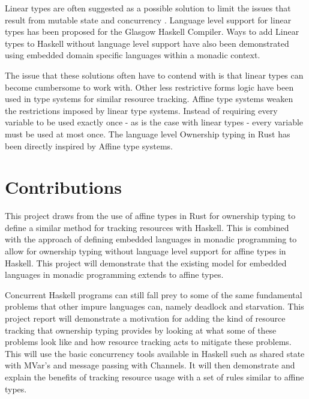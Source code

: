 \documentclass[onehalf,11pt]{beavtex}
\begin{document}
Linear types are often suggested as a possible solution to limit the issues that
result from mutable state \cite{Wadler90lineartypes} and concurrency
\cite{caires2010session}.  Language level support for linear types has been
proposed for the Glasgow Haskell Compiler. \cite{LinearTypesGHC}
Ways to add Linear types to Haskell without language level support have also
been demonstrated using embedded domain specific languages within a monadic
context. \cite{Paykin:2017:LM:3122955.3122965}

The issue that these solutions often have to contend with is that linear types
can become cumbersome to work with.
Other less restrictive forms logic have been used in type systems for similar
resource tracking.
Affine type systems weaken the restrictions imposed by linear type systems.
Instead of requiring every variable to be used exactly once - as is the case
with linear types - every variable must be used at most once.
The language level Ownership typing in Rust has been directly inspired by Affine
type systems.

\section{Contributions}

This project draws from the use of affine types in Rust for
ownership typing to define a similar method for tracking resources with Haskell.
This is combined with the approach of defining embedded languages in monadic
programming to allow for ownership typing without language level support for
affine types in Haskell. This project will demonstrate that the existing model
for embedded languages in monadic programming extends to affine types.

Concurrent Haskell programs can still fall prey to some of the same fundamental
problems that other impure languages can, namely deadlock and starvation.
This project report will demonstrate a motivation for adding the kind of
resource tracking that ownership typing provides by looking at what some of
these problems look like and how resource tracking acts to mitigate these
problems.  This will use the basic concurrency tools available in Haskell
such as shared state with MVar's and message passing with Channels.
It will then demonstrate and explain the benefits of tracking resource usage
with a set of rules similar to affine types.
\end{document}
